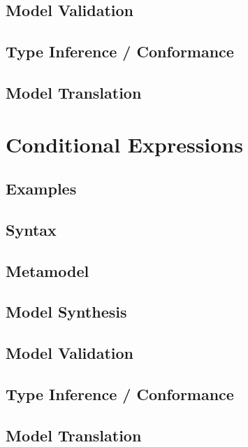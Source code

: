 \documentclass[a4paper,oneside,12pt, extrafontsizes]{memoir}
\begin{document}
    \section{Model Validation}
    

    \section{Type Inference / Conformance}

    \section{Model Translation}

  \chapter{Conditional Expressions}
  \label{ch:conditionals}
  

    \section{Examples}
    

    \section{Syntax}
    

    \section{Metamodel}

    \section{Model Synthesis}

    \section{Model Validation}
    

    \section{Type Inference / Conformance}

    \section{Model Translation}
\end{document}
